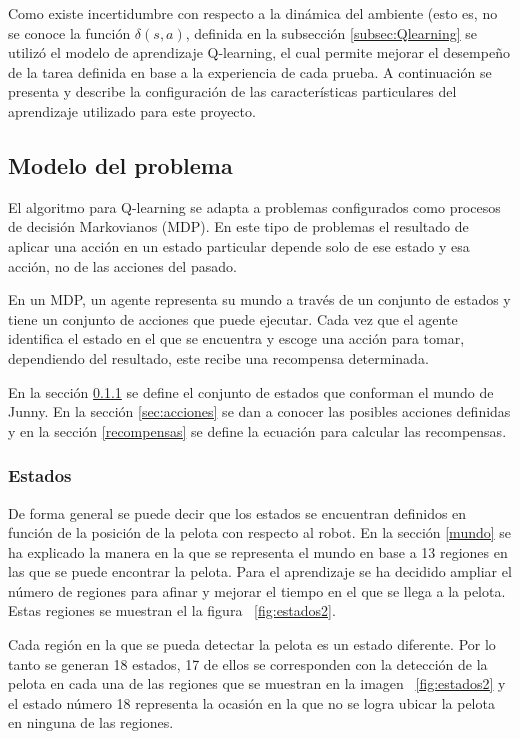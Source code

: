 Como existe incertidumbre con respecto a la dinámica del ambiente (esto es, no se conoce la función $\delta(s,a)$, definida en la subsección \ref{subsec:Qlearning} se utilizó el modelo de aprendizaje Q-learning, el cual permite mejorar el desempeño de la tarea definida en base a la experiencia de cada prueba. A continuación se presenta y describe la configuración de las caracter\'isticas particulares del aprendizaje utilizado para este proyecto.

\subsection{Modelo del problema}

El algoritmo para Q-learning se adapta a problemas configurados como procesos de decisión Markovianos (MDP). En este tipo de problemas el resultado de aplicar una acción en un estado particular depende solo de ese estado y esa acción, no de las acciones del pasado. 

En un MDP, un agente representa su mundo a través de un conjunto de estados y tiene un conjunto de acciones que puede ejecutar. Cada vez que el agente identifica el estado en el que se encuentra y escoge una acción para tomar, dependiendo del resultado, este recibe una recompensa determinada.

En la sección \ref{estados} se define el conjunto de estados que conforman el mundo de Junny. En la secci\'on \ref{sec:acciones} se dan a conocer las posibles acciones definidas y en la secci\'on \ref{recompensas} se define la ecuaci\'on para calcular las recompensas.   

\subsubsection{Estados}\label{estados}

De forma general se puede decir que los estados se encuentran definidos en función de la posición de la pelota con respecto al robot. En la sección \ref{mundo} se ha explicado la manera en la que se representa el mundo en base a 13 regiones en las que se puede encontrar la pelota. Para el aprendizaje se ha decidido ampliar el número de regiones para afinar y mejorar el tiempo en el que se llega a la pelota. Estas regiones se muestran el la figura ~\ref{fig:estados2}.

Cada región en la que se pueda detectar la pelota es un estado diferente. Por lo tanto se generan 18 estados, 17 de ellos se corresponden con la detección de la pelota en cada una de las regiones que se muestran en la imagen ~\ref{fig:estados2} y el estado número 18 representa la ocasión en la que no se logra ubicar la pelota en ninguna de las regiones.  

